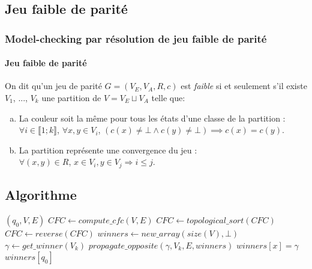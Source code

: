 \documentclass[11pt]{beamer}
\begin{document}
\subsection{Jeu faible de parité}
\begin{frame}
    \frametitle{Model-checking par résolution de jeu faible de parité}
    \framesubtitle{Jeu faible de parité}

    On dit qu'un jeu de parité $G = (V_E,V_A,R,c)$ est \emph{faible}  si et seulement s'il existe $V_1$, ..., $V_k$ une partition de $V = V_E \sqcup V_A$ telle que:
    \begin{enumerate}[a)]
    \item La couleur soit la même pour tous les états d'une classe de la partition : $\forall i \in \llbracket 1 ; k \rrbracket$, $\forall x, y \in V_i$, $(c(x) \neq \bot \land c(y) \neq \bot)  \implies c(x) = c(y)$.
    \item La partition représente une convergence du jeu :\\
    $\forall (x, y) \in R$, $x\in V_i, y \in V_j \Rightarrow i \leq j$.
    \end{enumerate}
\end{frame}


\subsection{Algorithme}
\footnotesize
\begin{algorithm}[h!]
    \caption{$solve\_weak\_game$}
\begin{algorithmic}[1]
    \REQUIRE $(q_0, V, E)$ 
    \STATE $CFC \leftarrow compute\_cfc(V, E)$
    \STATE $CFC \leftarrow topological\_sort(CFC)$
    \STATE $CFC \leftarrow reverse(CFC)$
    \STATE $winners \leftarrow new\_array(size(V), \bot)$
        \STATE $\gamma \leftarrow get\_winner(V_k)$
        \STATE $propagate\_opposite(\gamma, V_k, E, winners)$
                \STATE $winners[x] = \gamma$
            \ENDIF
        \ENDFOR
    \ENDFOR
    \RETURN $winners[q_0]$
\end{algorithmic}
\end{algorithm}
\end{document}
